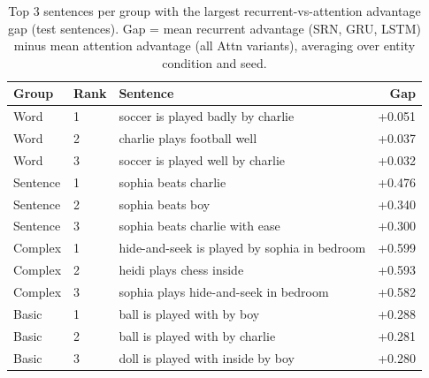 \begin{table}[t]
\centering\scriptsize
\begin{tabular}{@{}lllr@{}}
\toprule
\textbf{Group} & \textbf{Rank} & \textbf{Sentence} & \textbf{Gap} \\
\midrule
Word & 1 & soccer is played badly by charlie & +0.051 \\
Word & 2 & charlie plays football well & +0.037 \\
Word & 3 & soccer is played well by charlie & +0.032 \\
Sentence & 1 & sophia beats charlie & +0.476 \\
Sentence & 2 & sophia beats boy & +0.340 \\
Sentence & 3 & sophia beats charlie with ease & +0.300 \\
Complex & 1 & hide-and-seek is played by sophia in bedroom & +0.599 \\
Complex & 2 & heidi plays chess inside & +0.593 \\
Complex & 3 & sophia plays hide-and-seek in bedroom & +0.582 \\
Basic & 1 & ball is played with by boy & +0.288 \\
Basic & 2 & ball is played with by charlie & +0.281 \\
Basic & 3 & doll is played with inside by boy & +0.280 \\
\bottomrule
\end{tabular}
\caption{\small Top 3 sentences per group with the largest recurrent-vs-attention advantage gap (test sentences). Gap = mean recurrent advantage (SRN, GRU, LSTM) minus mean attention advantage (all Attn variants), averaging over entity condition and seed.}
\label{tab:test_sentence_arch_gap_compact}
\end{table}
